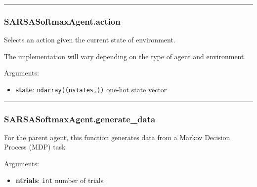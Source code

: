 \begin{center}\rule{0.5\linewidth}{\linethickness}\end{center}

\hypertarget{sarsasoftmaxagent.action}{%
\subsubsection{SARSASoftmaxAgent.action}\label{sarsasoftmaxagent.action}}

\begin{Shaded}
\begin{Highlighting}[]
\end{Highlighting}
\end{Shaded}

Selects an action given the current state of environment.

The implementation will vary depending on the type of agent and
environment.

Arguments:

\begin{itemize}
\tightlist
\item
  \textbf{state}: \texttt{ndarray((nstates,))} one-hot state vector
\end{itemize}

\begin{center}\rule{0.5\linewidth}{\linethickness}\end{center}

\hypertarget{sarsasoftmaxagent.generate_data}{%
\subsubsection{SARSASoftmaxAgent.generate\_data}\label{sarsasoftmaxagent.generate_data}}

\begin{Shaded}
\begin{Highlighting}[]
\end{Highlighting}
\end{Shaded}

For the parent agent, this function generates data from a Markov
Decision Process (MDP) task

Arguments:

\begin{itemize}
\tightlist
\item
  \textbf{ntrials}: \texttt{int} number of trials
\end{itemize}

